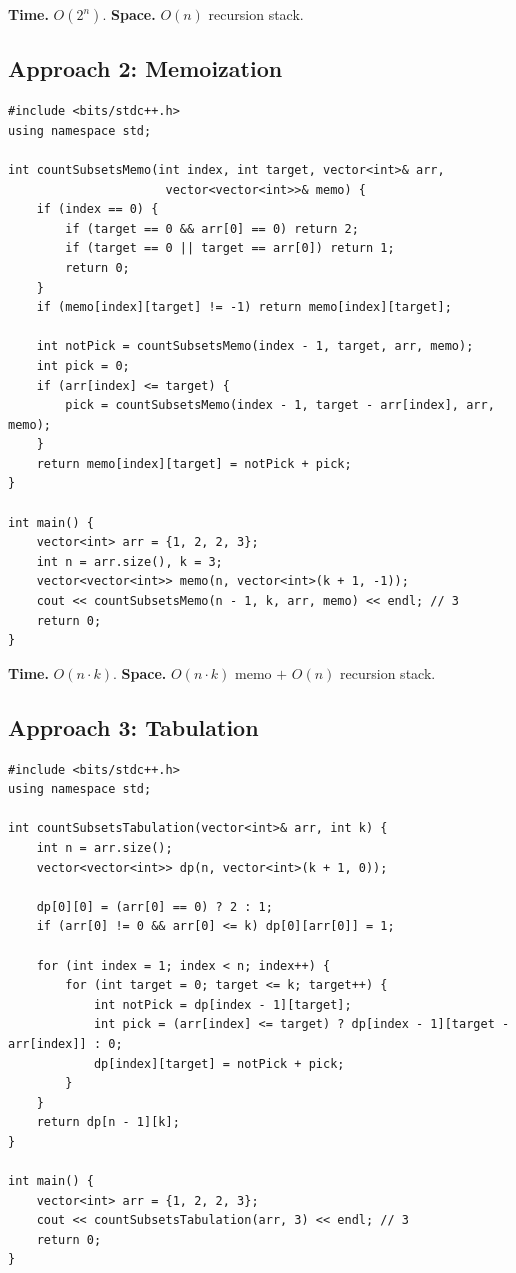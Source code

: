 \begin{complexitybox}
\textbf{Time.} $O(2^n)$.
\textbf{Space.} $O(n)$ recursion stack.
\end{complexitybox}

\subsection*{Approach 2: Memoization}

\begin{lstlisting}
#include <bits/stdc++.h>
using namespace std;

int countSubsetsMemo(int index, int target, vector<int>& arr,
                      vector<vector<int>>& memo) {
    if (index == 0) {
        if (target == 0 && arr[0] == 0) return 2;
        if (target == 0 || target == arr[0]) return 1;
        return 0;
    }
    if (memo[index][target] != -1) return memo[index][target];

    int notPick = countSubsetsMemo(index - 1, target, arr, memo);
    int pick = 0;
    if (arr[index] <= target) {
        pick = countSubsetsMemo(index - 1, target - arr[index], arr, memo);
    }
    return memo[index][target] = notPick + pick;
}

int main() {
    vector<int> arr = {1, 2, 2, 3};
    int n = arr.size(), k = 3;
    vector<vector<int>> memo(n, vector<int>(k + 1, -1));
    cout << countSubsetsMemo(n - 1, k, arr, memo) << endl; // 3
    return 0;
}
\end{lstlisting}

\begin{complexitybox}
\textbf{Time.} $O(n \cdot k)$.
\textbf{Space.} $O(n \cdot k)$ memo $+$ $O(n)$ recursion stack.
\end{complexitybox}

\subsection*{Approach 3: Tabulation}

\begin{lstlisting}
#include <bits/stdc++.h>
using namespace std;

int countSubsetsTabulation(vector<int>& arr, int k) {
    int n = arr.size();
    vector<vector<int>> dp(n, vector<int>(k + 1, 0));

    dp[0][0] = (arr[0] == 0) ? 2 : 1;
    if (arr[0] != 0 && arr[0] <= k) dp[0][arr[0]] = 1;

    for (int index = 1; index < n; index++) {
        for (int target = 0; target <= k; target++) {
            int notPick = dp[index - 1][target];
            int pick = (arr[index] <= target) ? dp[index - 1][target - arr[index]] : 0;
            dp[index][target] = notPick + pick;
        }
    }
    return dp[n - 1][k];
}

int main() {
    vector<int> arr = {1, 2, 2, 3};
    cout << countSubsetsTabulation(arr, 3) << endl; // 3
    return 0;
}
\end{lstlisting}

